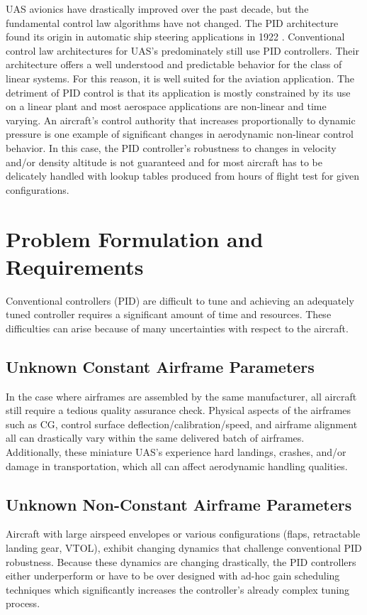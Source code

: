 \ac{UAS} avionics have drastically improved over the past decade, but the fundamental control law algorithms have not changed.  The \ac{PID} architecture found its origin in automatic ship steering applications in 1922 \cite{minorsky1922pid}.  Conventional control law architectures for \ac{UAS}'s predominately still use \ac{PID} controllers.  Their architecture offers a well understood and predictable behavior for the class of linear systems.  For this reason, it is well suited for the aviation application.  The detriment of \ac{PID} control is that its application is mostly constrained by its use on a linear plant and most aerospace applications are non-linear and time varying.   An aircraft's control authority that increases proportionally to dynamic pressure is one example of significant changes in aerodynamic non-linear control behavior.  In this case, the \ac{PID} controller's robustness to changes in velocity and/or density altitude is not guaranteed and for most aircraft has to be delicately handled with lookup tables produced from hours of flight test for given configurations.

\section{Problem Formulation and Requirements}
Conventional controllers (\ac{PID}) are difficult to tune and achieving an adequately tuned controller requires a significant amount of time and resources.  These difficulties can arise because of many uncertainties with respect to the aircraft.  
\subsection{Unknown Constant Airframe Parameters}
In the case where airframes are assembled by the same manufacturer, all aircraft still require a tedious quality assurance check.  Physical aspects of the airframes such as \ac{CG}, control surface deflection/calibration/speed, and airframe alignment all can drastically vary within the same delivered batch of airframes.  Additionally, these miniature \ac{UAS}'s experience hard landings, crashes, and/or damage in transportation, which all can affect aerodynamic handling qualities.

\subsection{Unknown Non-Constant Airframe Parameters}
Aircraft with large airspeed envelopes or various configurations (flaps, retractable landing gear, \ac{VTOL}), exhibit changing dynamics that challenge conventional \ac{PID} robustness.  Because these dynamics are changing drastically, the \ac{PID} controllers either underperform or have to be over designed with ad-hoc gain scheduling techniques which significantly increases the controller's already complex tuning process.  

